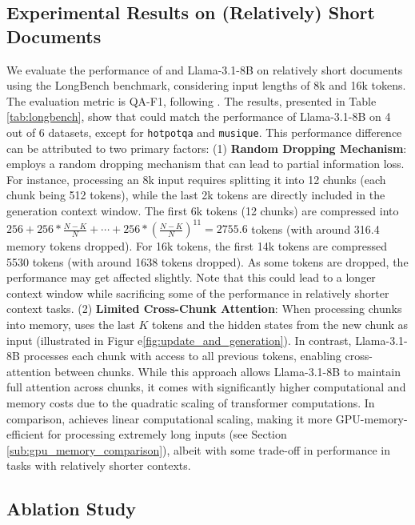 \subsection{Experimental Results on (Relatively) Short Documents}
\vspace{-3pt}
We evaluate the performance of \ours and Llama-3.1-8B on relatively short documents using the LongBench benchmark, considering input lengths of 8k and 16k tokens. The evaluation metric is QA-F1, following \citet{longbench}. The results, presented in Table \ref{tab:longbench}, show that \ours could match the performance of Llama-3.1-8B on 4 out of 6 datasets, except for \texttt{hotpotqa} and \texttt{musique}.
This performance difference can be attributed to two primary factors: 
(1) \textbf{Random Dropping Mechanism}: \ours employs a random dropping mechanism that can lead to partial information loss. For instance, processing an 8k input requires splitting it into 12 chunks (each chunk being 512 tokens), while the last 2k tokens are directly included in the generation context window. The first 6k tokens (12 chunks) are compressed into $256 + 256 * \frac{N-K}{N} + \cdots + 256 * (\frac{N-K}{N})^{11} = 2755.6$ tokens (with around 316.4 memory tokens dropped). For 16k tokens, the first 14k tokens are compressed 5530 tokens (with around 1638 tokens dropped). As some tokens are dropped, the performance may get affected slightly. Note that this could lead to a longer context window while sacrificing some of the performance in relatively shorter context tasks. 
(2) \textbf{Limited Cross-Chunk Attention}: When processing chunks into memory, \ours uses the last $K$ tokens and the hidden states from the new chunk as input (illustrated in Figur e\ref{fig:update_and_generation}). In contrast, Llama-3.1-8B processes each chunk with access to all previous tokens, enabling cross-attention between chunks. While this approach allows Llama-3.1-8B to maintain full attention across chunks, it comes with significantly higher computational and memory costs due to the quadratic scaling of transformer computations. In comparison, \ours achieves linear computational scaling, making it more GPU-memory-efficient for processing extremely long inputs (see Section \ref{sub:gpu_memory_comparison}), albeit with some trade-off in performance in tasks with relatively shorter contexts. 





\vspace{-5pt}
\subsection{Ablation Study}
\label{sub:ablation_study}
\vspace{-3pt}
